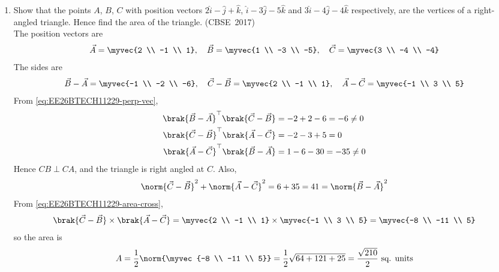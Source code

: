 \begin{enumerate}[label=\thesubsection.\arabic*, ref=\thesubsection.\theenumi]
\item 
Show that the points $A$, $B$, $C$ with position vectors $2\hat{i} - \hat{j} + \hat{k}$, $\hat{i} - 3\hat{j} - 5\hat{k}$ and $3\hat{i} - 4\hat{j} - 4\hat{k}$ respectively, are the vertices of a right-angled triangle. Hence find the area of the triangle.
\hfill (CBSE~2017)
\\
\solution
The position vectors are
\begin{align}
	\vec{A} = \myvec{2 \\ -1 \\ 1}, \quad \vec{B} = \myvec{1 \\ -3 \\ -5}, \quad \vec{C} = \myvec{3 \\ -4 \\ -4}
\end{align}
The sides are
\begin{align}
	\vec{B} - \vec{A} = \myvec{-1 \\ -2 \\ -6}, \quad \vec{C} - \vec{B} = \myvec{2 \\ -1 \\ 1}, \quad \vec{A} - \vec{C} = \myvec{-1 \\ 3 \\ 5}
\end{align}
From \eqref{eq:EE26BTECH11229-perp-vec},
\begin{align}
	\brak{\vec{B}-\vec{A}}^{\top}\brak{\vec{C}-\vec{B}} &= -2 + 2 - 6 = -6 \neq 0
	\\
	\brak{\vec{C}-\vec{B}}^{\top}\brak{\vec{A}-\vec{C}} &= -2 - 3 + 5 = 0
	\\
	\brak{\vec{A}-\vec{C}}^{\top}\brak{\vec{B}-\vec{A}} &= 1 - 6 - 30 = -35 \neq 0
\end{align}
Hence $CB \perp CA$, and the triangle is right angled at $C$. Also,
\begin{align}
	\norm{\vec{C}-\vec{B}}^2 + \norm{\vec{A}-\vec{C}}^2 = 6 + 35 = 41 = \norm{\vec{B}-\vec{A}}^2
\end{align}
From \eqref{eq:EE26BTECH11229-area-cross},
\begin{align}
	\brak{\vec{C}-\vec{B}}\times\brak{\vec{A}-\vec{C}} = \myvec{2 \\ -1 \\ 1}\times\myvec{-1 \\ 3 \\ 5} = \myvec{-8 \\ -11 \\ 5}
\end{align}
so the area is
\begin{align}
	A = \frac{1}{2}\norm{\myvec{-8 \\ -11 \\ 5}} = \frac{1}{2}\sqrt{64 + 121 + 25} = \frac{\sqrt{210}}{2} \text{ sq. units}
\end{align}


\end{enumerate}
